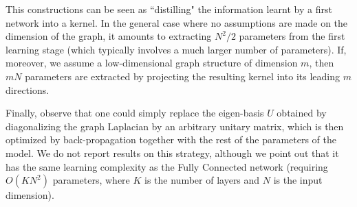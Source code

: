 \documentclass{article} %
\begin{document}
This constructions can be seen as ``distilling" the information learnt by a first network into a kernel. In the general case where no assumptions are made on the dimension of the graph, it amounts to extracting $N^2/2$ parameters from the first learning stage (which typically involves a much larger number of parameters). If, moreover, we assume a low-dimensional graph structure of dimension $m$, then $m N$ parameters are extracted by projecting the resulting kernel into its leading $m$ directions.

Finally, observe that one could simply replace the eigen-basis $U$ obtained by diagonalizing the graph Laplacian by an arbitrary unitary matrix, which is then optimized by back-propagation together with the rest of the parameters of the model. We do not report results on this strategy, although we point out that it has the same learning complexity as the Fully Connected network (requiring $O(K N^2)$ parameters, where $K$ is the number of layers and $N$ is the input dimension).





\end{document}
